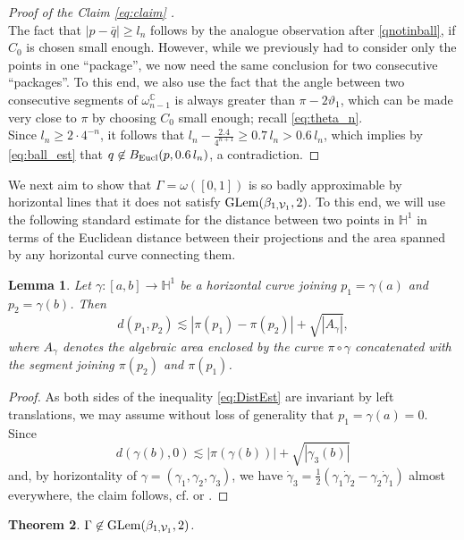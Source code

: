 \documentclass[12pt]{amsart}
\renewcommand{\H}{\mathbb H}
\newcommand{\C}{\mathbb C}
\renewcommand{\theta}{\vartheta}
\numberwithin{equation}{section}
\theoremstyle{plain}
\newtheorem{theorem}{Theorem}[section]
\newtheorem{lemma}[theorem]{Lemma}
\theoremstyle{definition}
\theoremstyle{remark}
\begin{document}
\begin{proof}[Proof of the Claim \eqref{eq:claim} ]
\begin{equation}
\end{equation}
The fact that $|p-\bar q|\geq l_n$ follows by the analogue observation after \eqref{qnotinball}, if $C_0$ is chosen small enough. However, while we previously had to consider only the points in one ``package'', we now need the same conclusion for two consecutive ``packages''. To this end,  
we also use the fact that the angle between  two consecutive segments of $\omega_{n-1}^\C$ is always greater than $\pi-2\theta_1$, which can be made very close to $\pi$ by choosing $C_0$ small enough; recall \eqref{eq:theta_n}.
\\ Since $l_n\geq 2\cdot 4^{-n}$, it follows that $l_n-\frac{2.4}{4^{n+1}}\geq 0.7\, l_n>0.6\,l_n$, which implies by \eqref{eq:ball_est} that $q\not\in B_{\rm Eucl}(p, 0.6\,l_n)$, a contradiction.
\end{proof}

We next aim to show that $\Gamma=\omega([0,1])$ is so badly approximable by horizontal lines that it does not satisfy  ${\rm GLem}(\beta_{1,\mathcal V_1},2)$. To this end, we will use the following standard estimate for the distance between two points in $\H^1$ in terms of the Euclidean distance between their projections and the area spanned by any horizontal curve connecting them. 
\begin{lemma}\label{distance}
    Let $\gamma:[a,b]\to\H^1$ be a horizontal curve joining $p_1=\gamma(a)$ and $p_2=\gamma(b)$. Then 
    \begin{equation}\label{eq:DistEst}
    d(p_1,p_2)\lesssim |\pi(p_1)-\pi(p_2)|+ \sqrt{|A_\gamma|},\end{equation}
    where $A_\gamma$ denotes the algebraic area enclosed by the curve $\pi\circ\gamma$ concatenated with the segment joining $\pi(p_2)$ and $\pi(p_1)$. 
\end{lemma}
\begin{proof}
As both sides of the inequality \eqref{eq:DistEst} are invariant by left translations, we may assume without loss of generality that $p_1=\gamma(a)=0$. Since
\begin{displaymath}
    d(\gamma(b),0)\lesssim |\pi(\gamma(b))|+\sqrt{|\gamma_3(b)|}
\end{displaymath}
and, by horizontality of $\gamma=(\gamma_1,\gamma_2,\gamma_3)$, we have $\dot{\gamma}_3=\frac{1}{2}(\gamma_1\dot{\gamma}_2-\gamma_2 \dot{\gamma}_1)$ almost everywhere, the claim follows, cf. \cite[(2.22)] {CDPT} or \cite[(1.1)]{Juillet}.
\end{proof}

\begin{theorem}\label{gammaglem}
    $\Gamma\not\in{\rm GLem}(\beta_{1,\mathcal V_1},2)$.
\end{theorem}
\end{document}
